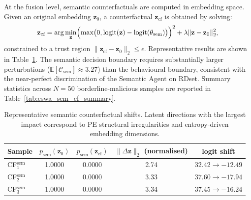 \begin{table}[ht]
\centering
\caption{Representative behavioural counterfactuals. Relative changes per Equation~\eqref{eq:eswa_cf}.}
\label{tab:eswa_cf}
\end{table}

At the fusion level, semantic counterfactuals are computed in embedding space. Given an original embedding $\mathbf{z}_0$, a counterfactual $\mathbf{z}_\text{cf}$ is obtained by solving:
\begin{equation}
\mathbf{z}_\text{cf} = \arg\min_{\mathbf{z}} \Bigl(\max\bigl(0, \text{logit}(\mathbf{z}) - \text{logit}(\theta_\text{sem})\bigr)\Bigr)^2 + \lambda \|\mathbf{z} - \mathbf{z}_0\|_2^2,
\label{eq:eswa_sem_cf}
\end{equation}
constrained to a trust region $\|\mathbf{z}_\text{cf} - \mathbf{z}_0\|_2 \leq \epsilon$. Representative results are shown in Table~\ref{tab:eswa_sem_cf}. The semantic decision boundary requires substantially larger perturbations ($\mathbb{E}[\mathcal{C}_\text{sem}] \approx 3.27$) than the behavioural boundary, consistent with the near-perfect discrimination of the Semantic Agent on RDset. Summary statistics across $N=50$ borderline-malicious samples are reported in Table~\ref{tab:eswa_sem_cf_summary}.

\begin{table}[ht]
\centering
\caption{Representative semantic counterfactual shifts. Latent directions with the largest impact correspond to PE structural irregularities and entropy-driven embedding dimensions.}
\label{tab:eswa_sem_cf}
\begin{tabular}{lcccc}
\toprule
\textbf{Sample} & $p_\text{sem}(\mathbf{z}_0)$ & $p_\text{sem}(\mathbf{z}_\text{cf})$ & $\|\Delta\mathbf{z}\|_2$ (normalised) & \textbf{logit shift} \\
\midrule
CF$^\text{sem}_1$ & 1.0000 & 0.0000 & 2.74 & $32.42 \to -12.49$ \\
CF$^\text{sem}_2$ & 1.0000 & 0.0000 & 3.33 & $37.60 \to -17.94$ \\
CF$^\text{sem}_3$ & 1.0000 & 0.0000 & 3.34 & $37.45 \to -16.24$ \\
\bottomrule
\end{tabular}
\end{table}

